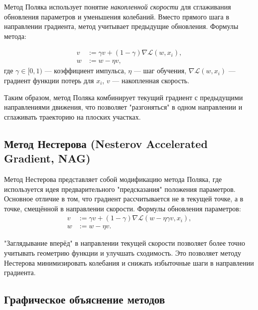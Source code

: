 Метод Поляка использует понятие \textit{накопленной скорости} для сглаживания обновления параметров и уменьшения колебаний. Вместо прямого шага в направлении градиента, метод учитывает предыдущие обновления. Формулы метода:

\begin{equation*}
\begin{aligned}
    v &:= \gamma v + (1 - \gamma) \nabla \mathcal{L}(w, x_i), \\
    w &:= w - \eta v,
\end{aligned}
\end{equation*}
где $\gamma \in [0, 1)$ — коэффициент импульса, $\eta$ — шаг обучения, $\nabla \mathcal{L}(w, x_i)$ — градиент функции потерь для $x_i$, $v$ — накопленная скорость.

Таким образом, метод Поляка комбинирует текущий градиент с предыдущими направлениями движения, что позволяет "разгоняться" в одном направлении и сглаживать траекторию на плоских участках.

\subsection*{Метод Нестерова (Nesterov Accelerated Gradient, NAG)}

Метод Нестерова представляет собой модификацию метода Поляка, где используется идея предварительного "предсказания" положения параметров. Основное отличие в том, что градиент рассчитывается не в текущей точке, а в точке, смещённой в направлении скорости. Формулы обновления параметров:
\begin{equation*}
\begin{aligned}
    v &:= \gamma v + (1 - \gamma) \nabla \mathcal{L}(w - \eta \gamma v, x_i), \\
    w &:= w - \eta v.
\end{aligned}
\end{equation*}

"Заглядывание вперёд" в направлении текущей скорости позволяет более точно учитывать геометрию функции и улучшать сходимость. Это позволяет методу Нестерова минимизировать колебания и снижать избыточные шаги в направлении градиента.

\subsection*{Графическое объяснение методов}

